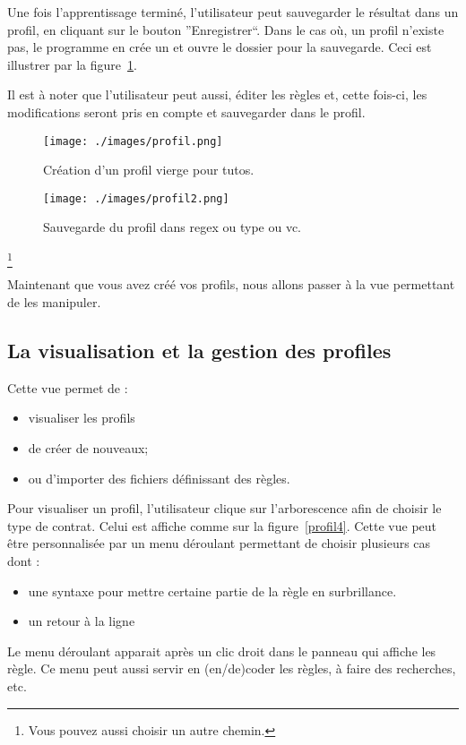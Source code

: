 \documentclass[a4paper,10pt,justified]{book}
\begin{document}
Une fois l'apprentissage terminé, l'utilisateur peut sauvegarder le résultat dans un profil, en cliquant sur le bouton  ''Enregistrer``. 
Dans le cas où, un profil n'existe pas, le programme en crée un et ouvre le dossier pour la sauvegarde. Ceci est illustrer par la figure~\ref{profil}. 

Il est à noter que l'utilisateur peut aussi, éditer les règles  et, cette fois-ci, les modifications seront pris en compte et sauvegarder dans le profil. 

\begin{figure}
\texttt{[image: ./images/profil.png]}
\label{profil}
\caption{Création d'un profil vierge pour tutos.}
\end{figure}

\begin{figure}
\texttt{[image: ./images/profil2.png]}
\label{profil2}
\caption{Sauvegarde du profil dans regex ou type ou vc.}
\end{figure}\footnote{Vous pouvez aussi choisir un autre chemin.}

Maintenant que vous avez créé vos profils, nous allons passer à la vue permettant de les manipuler. 

\subsection{La visualisation et la gestion des profiles}
Cette vue permet de : 
\begin{itemize}
 \item visualiser les profils
 \item de créer de nouveaux;
 \item ou d'importer des fichiers définissant des règles. 
\end{itemize}

Pour visualiser un profil, l'utilisateur clique sur l'arborescence afin de choisir le type de contrat. Celui est affiche comme sur la figure~\ref{profil4}. 
Cette vue peut être personnalisée par un menu déroulant permettant de choisir plusieurs cas dont : 
\begin{itemize}
 \item une syntaxe pour mettre certaine partie de la règle en surbrillance. 
 \item un retour à la ligne
\end{itemize}
Le menu déroulant apparait après un clic droit dans le panneau qui affiche les règle. Ce menu peut aussi servir en (en/de)coder les règles, à faire des recherches, etc. 
\end{document}
